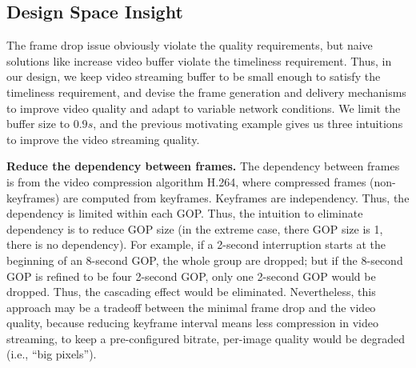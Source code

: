 \subsection{Design Space Insight}
The frame drop issue obviously violate the quality requirements, but naive solutions like increase video buffer violate the timeliness requirement. Thus, in our design, we keep video streaming buffer to be small enough to satisfy the timeliness requirement, and devise the frame generation and delivery mechanisms to improve video quality and adapt to variable network conditions. We limit the buffer size to $0.9s$, and the previous motivating example gives us three intuitions to improve the video streaming quality.


\textbf{Reduce the dependency between frames.}
The dependency between frames is from the video compression algorithm H.264, where compressed frames (non-keyframes) are computed from keyframes. Keyframes are independency. Thus, the dependency is limited within each GOP. Thus, the intuition to eliminate dependency is to reduce GOP size (in the extreme case, there GOP size is 1, there is no dependency). For example, if a 2-second interruption starts at the beginning of an 8-second GOP, the whole group are dropped; but if the 8-second GOP is refined to be four 2-second GOP, only one 2-second GOP would be dropped. Thus, the cascading effect would be eliminated. Nevertheless, this approach may be a tradeoff between the minimal frame drop and the video quality, because reducing keyframe interval means less compression in video streaming, to keep a pre-configured bitrate, per-image quality would be degraded (i.e., ``big pixels'').



